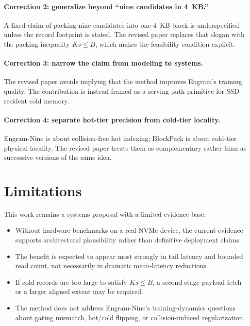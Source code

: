 \documentclass[11pt]{article}
\begin{document}
\paragraph{Correction 2: generalize beyond ``nine candidates in 4~KB.''}
A fixed claim of packing nine candidates into one 4~KB block is underspecified unless the record footprint is stated. The revised paper replaces that slogan with the packing inequality $Ks \leq B$, which makes the feasibility condition explicit.

\paragraph{Correction 3: narrow the claim from modeling to systems.}
The revised paper avoids implying that the method improves Engram's training quality. The contribution is instead framed as a serving-path primitive for SSD-resident cold memory.

\paragraph{Correction 4: separate hot-tier precision from cold-tier locality.}
Engram-Nine is about collision-free hot indexing; BlockPack is about cold-tier physical locality. The revised paper treats them as complementary rather than as successive versions of the same idea.

\section{Limitations}
This work remains a systems proposal with a limited evidence base.
\begin{itemize}[leftmargin=1.5em]
    \item Without hardware benchmarks on a real NVMe device, the current evidence supports architectural plausibility rather than definitive deployment claims.
    \item The benefit is expected to appear most strongly in tail latency and bounded read count, not necessarily in dramatic mean-latency reductions.
    \item If cold records are too large to satisfy $Ks \leq B$, a second-stage payload fetch or a larger aligned extent may be required.
    \item The method does not address Engram-Nine's training-dynamics questions about gating mismatch, hot/cold flipping, or collision-induced regularization.
\end{itemize}
\end{document}
